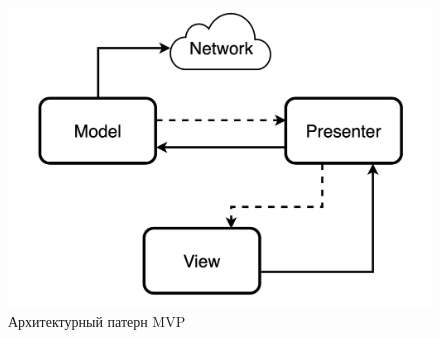  \begin{figure}[ht]
   \centering
   \includegraphics[scale=.25]{figures/mvp.jpg}
    \caption{Архитектурный патерн MVP}
    \label{mvp}
\end{figure}
